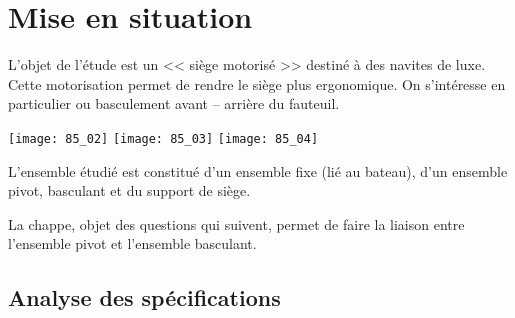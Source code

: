 \normaltrue
\correctionfalse


\setcounter{question}{0}



\ifcorrection
\else
{}
\fi

\section*{Mise en situation}
\ifprof
\else
\fi

L'objet de l'étude est un << siège motorisé >> destiné à des navites de luxe. Cette motorisation permet de rendre le siège plus ergonomique. On s'intéresse en particulier ou basculement avant -- arrière du fauteuil.

\begin{center}
\texttt{[image: 85\_02]}
\hspace{1cm}
\texttt{[image: 85\_03]}
\hspace{1cm}
\texttt{[image: 85\_04]}
\end{center}

L'ensemble étudié est constitué d'un ensemble fixe (lié au bateau), d'un ensemble pivot, basculant et du support de siège.

La chappe, objet des questions qui suivent, permet de faire la liaison entre l'ensemble pivot et l'ensemble basculant. 

\subsection*{Analyse des spécifications}






